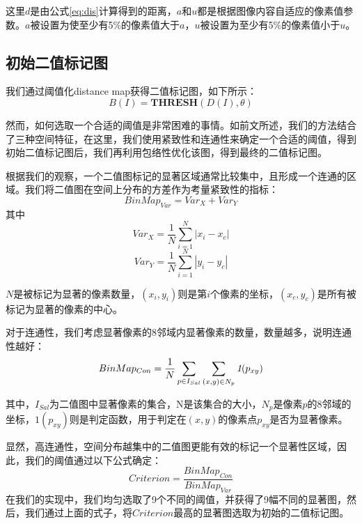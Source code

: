 这里$d$是由公式\ref{eq:dis}计算得到的距离，$a$和$u$都是根据图像内容自适应的像素值参数。$a$被设置为使至少有5\%的像素值大于$a$，$u$被设置为至少有5\%的像素值小于$u$。

\subsection{初始二值标记图}
我们通过阈值化distance map获得二值标记图，如下所示：
\begin{equation}
B(I)= \textbf{THRESH}(D(I), \theta)
\end{equation}

然而，如何选取一个合适的阈值是非常困难的事情。如前文所述，我们的方法结合了三种空间特征，在这里，我们使用紧致性和连通性来确定一个合适的阈值，得到初始二值标记图后，我们再利用包络性优化该图，得到最终的二值标记图。

根据我们的观察，一个二值图标记的显著区域通常比较集中，且形成一个连通的区域。我们将二值图在空间上分布的方差作为考量紧致性的指标：
\begin{equation}
BinMap_{Var} = Var_X + Var_Y
\end{equation}
其中
\begin{equation}
Var_X = \frac{1}{N} \sum_{i=1}^N |x_i-x_c|
\end{equation}
\begin{equation}
Var_Y = \frac{1}{N} \sum_{i=1}^N |y_i-y_c|
\end{equation}

$N$是被标记为显著的像素数量，$(x_i,y_i)$则是第$i$个像素的坐标，$(x_c,y_c)$是所有被标记为显著的像素的中心。

对于连通性，我们考虑显著像素的8邻域内显著像素的数量，数量越多，说明连通性越好：
\begin{equation}
BinMap_{Con} = \frac{1}{N}\sum_{p\in I_{Sal}}\sum_{(x,y)\in N_p}\emph{1}(p_{xy})
\end{equation}

其中，$I_{Sal}$为二值图中显著像素的集合，N是该集合的大小，$N_p$是像素$p$的8邻域的坐标，$1(p_{xy})$则是判定函数，用于判定在$(x,y)$的像素点$p_{xy}$是否为显著像素。

显然，高连通性，空间分布越集中的二值图更能有效的标记一个显著性区域，因此，我们的阈值通过以下公式确定：
\begin{equation}
Criterion = \frac{BinMap_{Con}}{BinMap_{Var}}
\end{equation}
在我们的实现中，我们均匀选取了9个不同的阈值，并获得了9幅不同的显著图，然后，我们通过上面的式子，将$Criterion$最高的显著图选取为初始的二值标记图。

